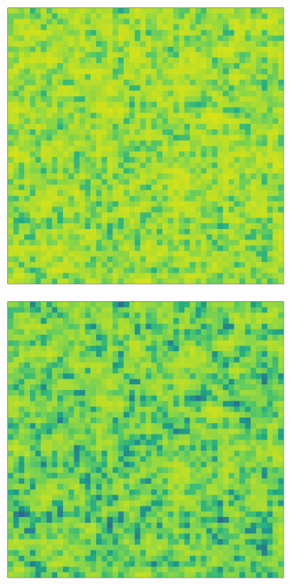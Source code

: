 \documentclass[../main.tex]{subfiles}
\begin{document}
\begin{figure}[H]
\begin{subfigure}[b]{0.11\textwidth}
    \end{subfigure}
    \hfill
    \begin{subfigure}[b]{0.11\textwidth}
        \centering 
        \includegraphics[keepaspectratio, width = \linewidth]{../figures/fig3.8.2.3.png}
    \end{subfigure}
    \hfill
    \begin{subfigure}[b]{0.11\textwidth}
        \centering 
        \includegraphics[keepaspectratio, width = \linewidth]{../figures/fig3.8.2.4.png}

\end{subfigure}
\end{figure}
\end{document}
